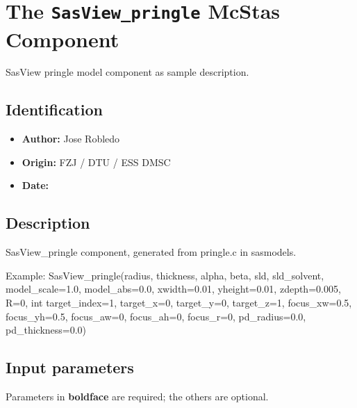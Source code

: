 \section{The \texttt{SasView\_pringle} McStas Component}
SasView pringle model component as sample description.

\subsection*{Identification}
\begin{itemize}
  \item \textbf{Author:} Jose Robledo
  \item \textbf{Origin:} FZJ / DTU / ESS DMSC
  \item \textbf{Date:} 
\end{itemize}

\subsection*{Description}
SasView\_pringle component, generated from pringle.c in sasmodels.

Example: SasView\_pringle(radius, thickness, alpha, beta, sld, sld\_solvent, model\_scale=1.0, model\_abs=0.0, xwidth=0.01, yheight=0.01, zdepth=0.005, R=0, int target\_index=1, target\_x=0, target\_y=0, target\_z=1, focus\_xw=0.5, focus\_yh=0.5, focus\_aw=0, focus\_ah=0, focus\_r=0, pd\_radius=0.0, pd\_thickness=0.0)

\subsection*{Input parameters}
Parameters in \textbf{boldface} are required; the others are optional.

